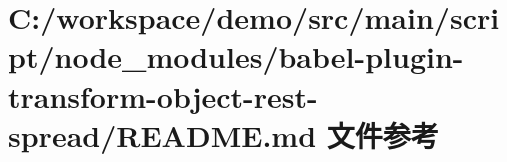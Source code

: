 \hypertarget{node__modules_2babel-plugin-transform-object-rest-spread_2_r_e_a_d_m_e_8md}{}\section{C\+:/workspace/demo/src/main/script/node\+\_\+modules/babel-\/plugin-\/transform-\/object-\/rest-\/spread/\+R\+E\+A\+D\+ME.md 文件参考}
\label{node__modules_2babel-plugin-transform-object-rest-spread_2_r_e_a_d_m_e_8md}
